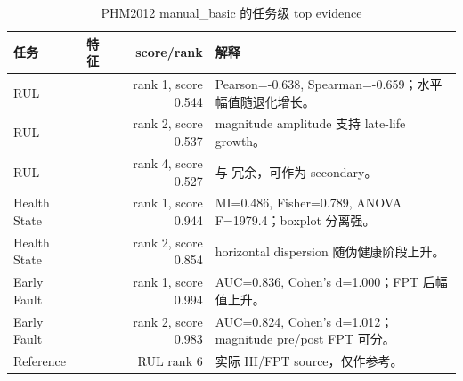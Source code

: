 \begin{table}[htbp]
\centering
\caption{PHM2012 manual\_basic 的任务级 top evidence}
\label{tab:phm2012_feature_evidence}
\scriptsize
\begin{tabularx}{\textwidth}{llrY}
\toprule
任务 & 特征 & score/rank & 解释 \\
\midrule
RUL &  & rank 1, score 0.544 & Pearson=-0.638, Spearman=-0.659；水平幅值随退化增长。\\
RUL &  & rank 2, score 0.537 & magnitude amplitude 支持 late-life growth。\\
RUL &  & rank 4, score 0.527 & 与  冗余，可作为 secondary。\\
Health State &  & rank 1, score 0.944 & MI=0.486, Fisher=0.789, ANOVA F=1979.4；boxplot 分离强。\\
Health State &  & rank 2, score 0.854 & horizontal dispersion 随伪健康阶段上升。\\
Early Fault &  & rank 1, score 0.994 & AUC=0.836, Cohen's d=1.000；FPT 后幅值上升。\\
Early Fault &  & rank 2, score 0.983 & AUC=0.824, Cohen's d=1.012；magnitude pre/post FPT 可分。\\
Reference &  & RUL rank 6 & 实际 HI/FPT source，仅作参考。\\
\bottomrule
\end{tabularx}
\end{table}
